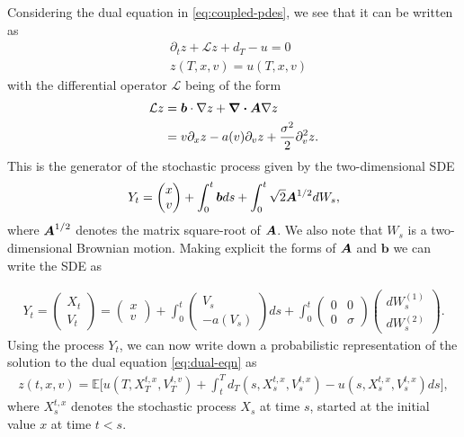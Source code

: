 \documentclass{article}  %
\begin{document}
Considering the dual equation in \autoref{eq:coupled-pdes}, we see that it can be written as
%
\begin{align} 
    \label{eq:dual-eqn}
    &\partial_t z + \mathcal{L} z + d_T - u = 0 \\
    &z(T,x,v) = u(T,x,v)
\end{align}
%
with the differential operator $\mathcal{L}$ being of the form
%
\begin{align} 
    \mathcal{L}z &= \boldsymbol{b}\cdot \nabla z + \div{\boldsymbol{A}\nabla z} \\
    &= v \partial_x z - a(v) \partial_v z + \frac{\sigma^2}{2}\partial^2_v z.
\end{align}
%
This is the generator of the stochastic process given by the two-dimensional SDE
%
\begin{align} 
    Y_t &= \begin{pmatrix}
        x\\
        v
    \end{pmatrix} 
    + \int_0^t \boldsymbol{b} ds + \int_0^t \sqrt{2}\boldsymbol{A}^{1/2} dW_s,\\
\end{align}
%
where $\boldsymbol{A}^{1/2}$ denotes the matrix square-root of $\boldsymbol{A}$. We also note that $W_s$ is a two-dimensional Brownian motion. Making explicit the forms of $\boldsymbol{A}$ and $\mathbf{b}$ we can write the SDE as

%
\begin{align}
    \label{eq:model-sde}
    Y_t = 
\begin{pmatrix}
    X_t\\
    V_t
\end{pmatrix}
= 
\begin{pmatrix}
    x\\
    v
\end{pmatrix}
+ \int_0^t 
\begin{pmatrix}
    V_s\\
    -a(V_s)
\end{pmatrix}
ds 
+ \int_0^t
\begin{pmatrix}
    0 & 0\\
    0 & \sigma 
\end{pmatrix}
\begin{pmatrix}
    dW_s^{(1)}\\
    dW_s^{(2)}
\end{pmatrix}.
\end{align}
%
Using the process $Y_t$, we can now write down a probabilistic representation of the solution to the dual equation \autoref{eq:dual-eqn} as
%
\begin{align}
    z(t,x,v) = \mathbb{E} \bigg[ u(T,X_T^{t,x},V_T^{t,v}) + \int_t^T d_T(s,X_s^{t,x},V_s^{t,x}) - u(s,X_s^{t,x},V_s^{t,x}) ds \bigg],
\end{align}
%
where $X_s^{t,x}$ denotes the stochastic process $X_s$ at time $s$, started at the initial value $x$ at time $t<s$.
\end{document}
